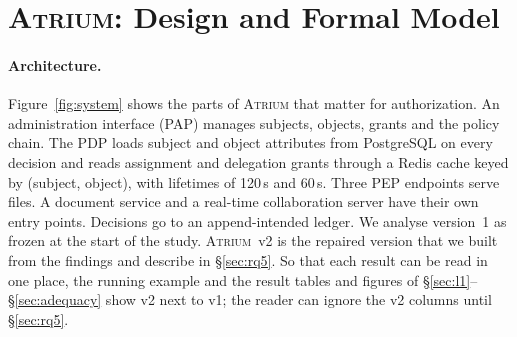 \documentclass[sigconf,review,anonymous]{acmart}
\newcommand{\sysname}{\textsc{Atrium}\xspace}
\newcommand{\sysname}{\textsc{OpenZTAC}\xspace}
\begin{document}
\section{\sysname: Design and Formal Model}
\label{sec:system}

\paragraph{Architecture.} Figure~\ref{fig:system} shows the parts of \sysname that matter for authorization.
An administration interface (PAP) manages subjects, objects, grants and the policy chain. The PDP loads
subject and object attributes from PostgreSQL on every decision and reads assignment and delegation grants
through a Redis cache keyed by (subject, object), with lifetimes of 120\,s and 60\,s. Three PEP endpoints serve
files. A document service and a real-time collaboration server have their own entry points. Decisions go to
an append-intended ledger. We analyse version~1 as frozen at the start of the study. \sysname~v2 is the
repaired version that we built from the findings and describe in \S\ref{sec:rq5}. So that each result can be
read in one place, the running example and the result tables and figures of \S\ref{sec:l1}--\S\ref{sec:adequacy}
show v2 next to v1; the reader can ignore the v2 columns until \S\ref{sec:rq5}.
\end{document}

